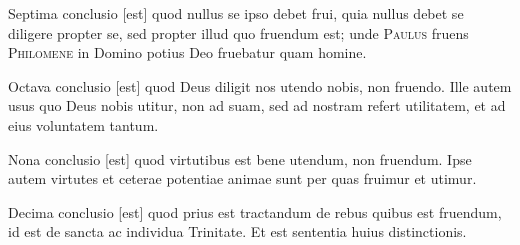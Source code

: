 \documentclass[twoside, openright]{article}
\newcommand{\name}[1]{\textsc{#1}}
\begin{document}
        \pstart
        Septima conclusio [est] quod nullus se ipso debet frui, quia nullus debet se diligere propter se, sed propter illud quo fruendum est; unde \name{Paulus} fruens \name{Philomene} in Domino potius Deo fruebatur quam homine.
        \pend
     
        \pstart
        Octava conclusio [est] quod Deus diligit nos utendo nobis, non fruendo. Ille autem  usus quo  Deus nobis utitur, non ad suam, sed ad nostram refert utilitatem, et ad eius voluntatem tantum.
        \pend
     
        \pstart
        Nona conclusio [est] quod virtutibus est bene utendum, non fruendum. Ipse autem virtutes et ceterae potentiae animae sunt per quas fruimur et utimur.
        \pend
     
        \pstart
        Decima conclusio [est] quod prius est tractandum de rebus quibus est fruendum, id est de sancta ac individua Trinitate. Et est sententia huius distinctionis.
        \pend
      
        \endnumbering
        
     
        
\end{document}
